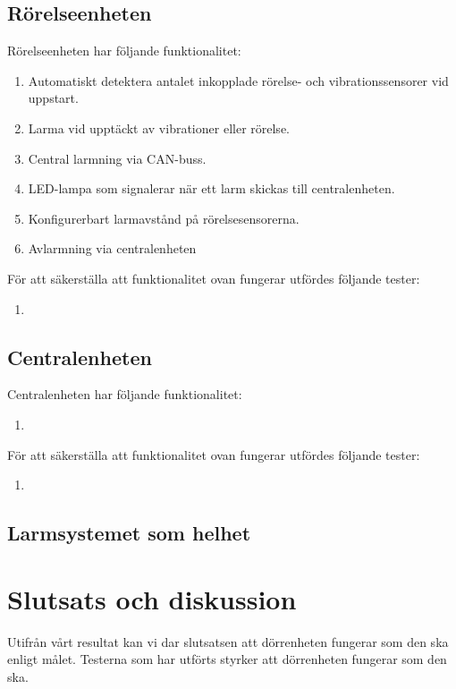 \documentclass{article}
\begin{document}
 \subsection{Rörelseenheten}
 Rörelseenheten har följande funktionalitet:
 \begin{enumerate}
 	\item Automatiskt detektera antalet inkopplade rörelse- och vibrationssensorer vid uppstart.
	\item Larma vid upptäckt av vibrationer eller rörelse.
    	\item Central larmning via CAN-buss.
	\item LED-lampa som signalerar när ett larm skickas till centralenheten.
	\item Konfigurerbart larmavstånd på rörelsesensorerna.
	\item Avlarmning via centralenheten
 \end{enumerate}
 För att säkerställa att funktionalitet ovan fungerar utfördes följande tester:
 \begin{enumerate}
     \item 
 \end{enumerate}
 \subsection{Centralenheten}
 Centralenheten har följande funktionalitet:
 \begin{enumerate}
     \item
 \end{enumerate}
 För att säkerställa att funktionalitet ovan fungerar utfördes följande tester:
 \begin{enumerate}
     \item 
 \end{enumerate}
 \subsection{Larmsystemet som helhet}
\section{Slutsats och diskussion}
Utifrån vårt resultat kan vi dar slutsatsen att dörrenheten fungerar som den
ska enligt målet. Testerna som har utförts styrker att dörrenheten fungerar som
den ska.
\end{document}
